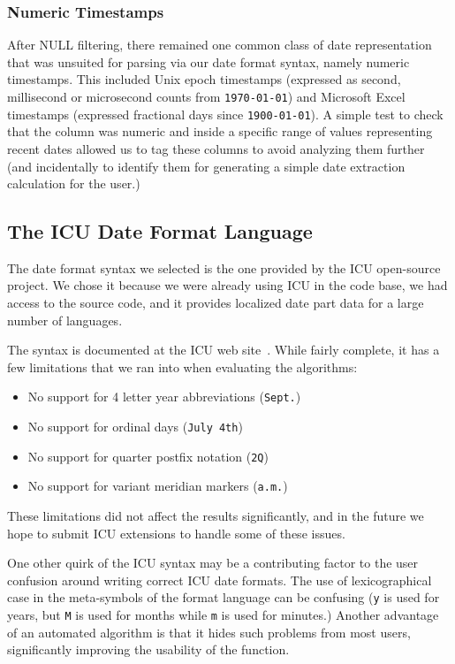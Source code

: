 \subsubsection{Numeric Timestamps}
After NULL filtering, there remained one common class of date representation that was unsuited for parsing via our date format syntax, namely numeric timestamps. This included Unix epoch timestamps (expressed as second, millisecond or microsecond counts from \texttt{1970-01-01}) and Microsoft Excel timestamps (expressed fractional days since \texttt{1900-01-01}). A simple test to check that the column was numeric and inside a specific range of values representing recent dates allowed us to tag these columns to avoid analyzing them further (and incidentally to identify them for generating a simple date extraction calculation for the user.)

\subsection{The ICU Date Format Language}
The date format syntax we selected is the one provided by the ICU open-source project. We chose it because we were already using ICU in the code base, we had access to the source code, and it provides localized date part data for a large number of languages.

The syntax is documented at the ICU web site~\cite{ICU}. While fairly complete, it has a few limitations that we ran into when evaluating the algorithms:
\begin{itemize}
\item No support for 4 letter year abbreviations (\eg \texttt{Sept.})
\item No support for ordinal days (\eg \texttt{July 4th})
\item No support for quarter postfix notation (\eg \texttt{2Q})
\item No support for variant meridian markers (\eg \texttt{a.m.})
\end{itemize}

These limitations did not affect the results significantly, and in the future we hope to submit ICU extensions to handle some of these issues.

One other quirk of the ICU syntax may be a contributing factor to the user confusion around writing correct ICU date formats. The use of lexicographical case in the meta-symbols of the format language can be confusing (\eg \texttt{y} is used for years, but \texttt{M} is used for months while \texttt{m} is used for minutes.) Another advantage of an automated algorithm is that it hides such problems from most users, significantly improving the usability of the function.

